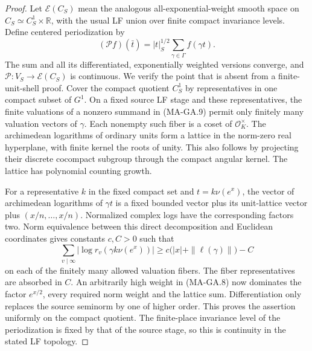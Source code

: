 \begin{proof}
Let $\mathcal E(C_S)$ mean the analogous all-exponential-weight
smooth space on $C_S\simeq C_S^1\times\mathbb R$, with the
usual LF union over finite compact invariance levels.
Define centered periodization by
\[
 (\mathcal P f)(\bar t)
      =|t|_S^{1/2}\sum_{\gamma\in\Gamma}f(\gamma t).
 \tag{MA-GA.9}
\]
The sum and all its differentiated, exponentially weighted
versions converge, and $\mathcal P:V_S\to\mathcal E(C_S)$
is continuous.  We verify the point that is absent from a
finite-unit-shell proof.  Cover the compact quotient $C_S^1$
by representatives in one compact subset of $G^1$.
On a fixed source LF stage and these representatives, the
finite valuations of a nonzero summand in (MA-GA.9) permit
only finitely many valuation vectors of $\gamma$.
Each nonempty such fiber is a coset of $\mathcal O_K^\times$.
The archimedean logarithms of ordinary units form a lattice
in the norm-zero real hyperplane, with finite kernel the
roots of unity.  This also follows by projecting their
discrete cocompact subgroup through the compact angular
kernel.  The lattice has polynomial counting growth.

For a representative $k$ in the fixed compact set and
$t=k\nu(e^x)$, the vector of archimedean logarithms of
$\gamma t$ is a fixed bounded vector plus its unit-lattice
vector plus $(x/n,\ldots,x/n)$.  Normalized complex logs
have the corresponding factors two.  Norm equivalence
between this direct decomposition and Euclidean coordinates
gives constants $c,C>0$ such that
\[
 \sum_{v\mid\infty}|\log r_v(\gamma k\nu(e^x))|
       \geq c\bigl(|x|+\|\ell(\gamma)\|\bigr)-C
 \tag{MA-GA.10}
\]
on each of the finitely many allowed valuation fibers.
The fiber representatives are absorbed in $C$.
An arbitrarily high weight in (MA-GA.8) now dominates the
factor $e^{x/2}$, every required norm weight and the lattice
sum.  Differentiation only replaces the source seminorm by
one of higher order.  This proves the assertion uniformly
on the compact quotient.  The finite-place invariance level
of the periodization is fixed by that of the source stage,
so this is continuity in the stated LF topology.


\end{proof}
